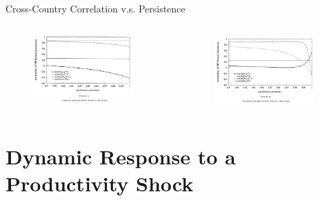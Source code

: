 \documentclass[10pt]{beamer}
\begin{document}
\begin{frame}{Cross-Country Correlation v.s. Persistence}
\begin{columns}
\begin{column}{0.49\paperwidth}
\begin{figure}[thbp]
  \centering
  \includegraphics[width=0.90\textwidth,height=0.5\textheight]{8.png}
\end{figure}
\end{column}

\begin{column}{0.49\paperwidth}
\begin{figure}[thbp]
  \centering
  \includegraphics[width=0.90\textwidth,height=0.5\textheight]{9.png}
\end{figure}
\end{column}
\end{columns}
\end{frame}

\section[Dynamic Analysis]{Dynamic Response to a Productivity Shock}
\end{document}
